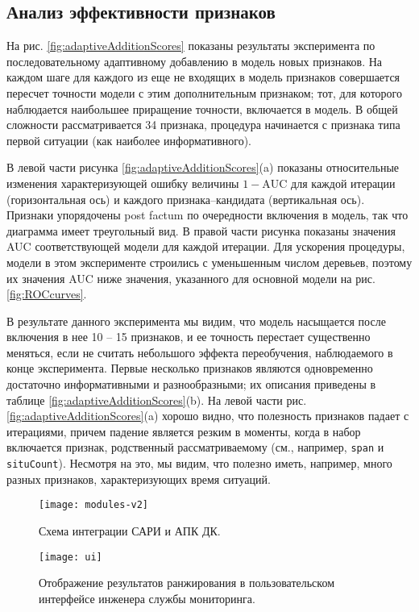 \subsection{Анализ эффективности признаков}\label{sec:greedy}
На рис. \ref{fig:adaptiveAdditionScores} показаны результаты эксперимента по последовательному адаптивному добавлению в модель новых признаков. На каждом шаге для каждого из еще не входящих в модель признаков совершается пересчет точности модели с этим дополнительным признаком; тот, для которого наблюдается наибольшее приращение точности, включается в модель. В общей сложности рассматривается 34 признака, процедура начинается с признака типа первой ситуации (как наиболее информативного).

В левой части рисунка \ref{fig:adaptiveAdditionScores}(a) показаны относительные изменения характеризующей ошибку величины $1-\text{AUC}$ для каждой итерации (горизонтальная ось) и каждого признака--кандидата (вертикальная ось). Признаки упорядочены post factum по очередности включения в модель, так что диаграмма имеет треугольный вид. В правой части рисунка показаны значения AUC соответствующей модели для каждой итерации. Для ускорения процедуры, модели в этом эксперименте строились с уменьшенным числом деревьев, поэтому их значения AUC ниже значения, указанного для основной модели на рис. \ref{fig:ROCcurves}.

В результате данного эксперимента мы видим, что модель насыщается после включения в нее 10 -- 15 признаков, и ее точность перестает существенно меняться, если не считать небольшого эффекта переобучения, наблюдаемого в конце эксперимента. Первые несколько признаков являются одновременно достаточно информативными и разнообразными; их описания приведены в таблице \ref{fig:adaptiveAdditionScores}(b). На левой части рис. \ref{fig:adaptiveAdditionScores}(a) хорошо видно, что полезность признаков падает с итерациями, причем падение является резким в моменты, когда в набор включается признак, родственный рассматриваемому (см., например, \texttt{span} и \texttt{situCount}). Несмотря на это, мы видим, что полезно иметь, например, много разных признаков, характеризующих время ситуаций.

\begin{figure}[thb]
\centering
\texttt{[image: modules-v2]}
\centering
\caption{Схема интеграции САРИ и АПК ДК.}
\centering
\label{fig:modules}
\end{figure}

\begin{figure*}[thb]
\centering
\texttt{[image: ui]}
\caption{Отображение результатов ранжирования в пользовательском интерфейсе инженера службы мониторинга.}
\centering
\label{fig:ui}
\end{figure*}


